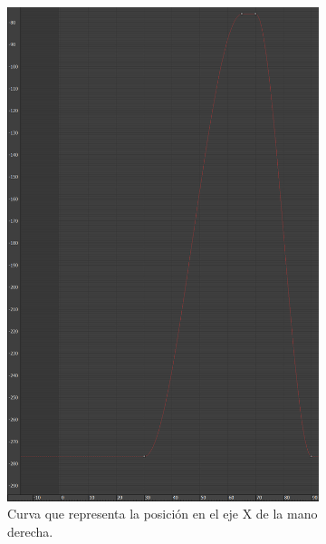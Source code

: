 \begin{figure}[H]
   \centering
   \begin{subfigure}[t]{0.32\textwidth}
       \centering
       \includegraphics[width=\textwidth]{imagenes/manos/derecha/posX.png}
       \caption{Curva que representa la posición en el eje X de la mano derecha.}
    \end{subfigure}
   \hfill
    \begin{subfigure}[t]{0.32\textwidth}
       \centering

\end{subfigure}
\end{figure}
